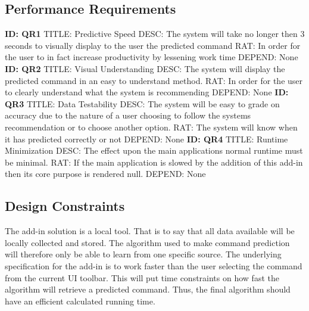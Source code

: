 \documentclass[onecolumn, draftclsnofoot,10pt, compsoc]{IEEEtran}
\begin{document}
\subsection{Performance Requirements}
\textbf{ID: QR1}\newline
TITLE: Predictive Speed\newline
DESC: The system will take no longer then 3 seconds to visually display to the user the predicted command\newline
RAT: In order for the user to in fact increase productivity by lessening work time\newline
DEPEND: None\newline
\newline
\textbf{ID: QR2}\newline
TITLE: Visual Understanding\newline
DESC: The system will display the predicted command in an easy to understand method. \newline
RAT: In order for the user to clearly understand what the system is recommending\newline
DEPEND: None\newline
\newline
\textbf{ID: QR3}\newline
TITLE: Data Testability\newline
DESC: The system will be easy to grade on accuracy due to the nature of a user choosing to follow the systems recommendation or to choose another option.\newline
RAT: The system will know when it has predicted correctly or not\newline
DEPEND: None\newline
\newline
\textbf{ID: QR4}\newline
TITLE: Runtime Minimization\newline
DESC: The effect upon the main applications normal runtime must be minimal.\newline
RAT: If the main application is slowed by the addition of this add-in then its core purpose is rendered null.\newline
DEPEND: None\newline
\subsection{Design Constraints}
The add-in solution is a local tool. That is to say that all data available will be locally collected and stored. The algorithm used to make command prediction will therefore only be able to learn from one specific source. The underlying specification for the add-in is to work faster than the user selecting the command from the current UI toolbar. This will put time constraints on how fast the algorithm will retrieve a predicted command. Thus, the final algorithm should have an efficient calculated running time. 
\end{document}
